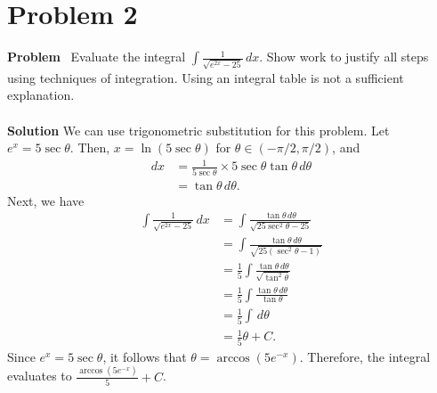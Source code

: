\section{Problem 2}
\edef\sectionheader{February 16}

\noindent \textbf{Problem} \ Evaluate the integral $\int \frac{1}{\sqrt{e^{2x}-25}} \,dx$. Show work to justify all steps using techniques of
integration. Using an integral table is not a sufficient explanation.
\\\\
\noindent \textbf{Solution} We can use trigonometric substitution for this problem. Let $e^x = 5\sec\theta$. Then, $x = \ln(5\sec\theta)$ for $\theta \in (-\pi/2,\pi/2)$, and
\begin{align*}
    dx & = \frac{1}{5\sec\theta} \times 5\sec\theta\tan\theta \,d\theta \\
    & = \tan\theta \,d\theta.
\end{align*}
Next, we have
\begin{align*}
    \int \frac{1}{\sqrt{e^{2x}-25}} \,dx & = \int \frac{\tan\theta \,d\theta}{\sqrt{25\sec^2\theta - 25}} \\
    & = \int \frac{\tan\theta \,d\theta}{\sqrt{25(\sec^2\theta - 1)}} \\
    & = \frac15 \int \frac{\tan\theta \,d\theta}{\sqrt{\tan^2\theta}} \\
    & = \frac15 \int \frac{\tan\theta \,d\theta}{\tan\theta} \\
    & = \frac15 \int \,d\theta \\
    & = \frac15 \theta + C.
\end{align*}
Since $e^x = 5\sec\theta$, it follows that $\theta = \arccos(5e^{-x})$. Therefore, the integral evaluates to $\frac{\arccos(5e^{-x})}{5} + C$.